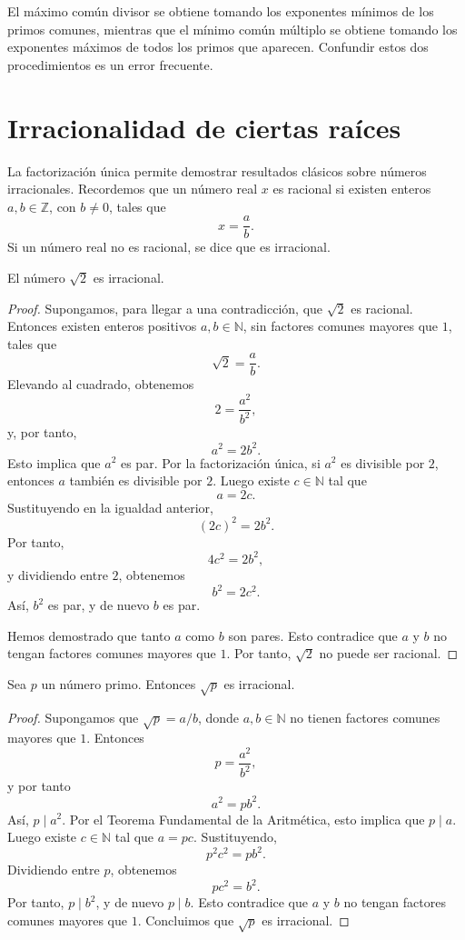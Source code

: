\begin{advertencia}
El máximo común divisor se obtiene tomando los exponentes mínimos de los primos comunes, mientras que el mínimo común múltiplo se obtiene tomando los exponentes máximos de todos los primos que aparecen. Confundir estos dos procedimientos es un error frecuente.
\end{advertencia}

\section{Irracionalidad de ciertas raíces}

La factorización única permite demostrar resultados clásicos sobre números irracionales. Recordemos que un número real \(x\) es racional si existen enteros \(a,b\in\mathbb{Z}\), con \(b\neq 0\), tales que
\[
  x=\frac{a}{b}.
\]
Si un número real no es racional, se dice que es irracional.

\begin{teorema}
El número \(\sqrt{2}\) es irracional.
\end{teorema}

\begin{proof}
Supongamos, para llegar a una contradicción, que \(\sqrt{2}\) es racional. Entonces existen enteros positivos \(a,b\in\mathbb{N}\), sin factores comunes mayores que \(1\), tales que
\[
  \sqrt{2}=\frac{a}{b}.
\]
Elevando al cuadrado, obtenemos
\[
  2=\frac{a^2}{b^2},
\]
y, por tanto,
\[
  a^2=2b^2.
\]
Esto implica que \(a^2\) es par. Por la factorización única, si \(a^2\) es divisible por \(2\), entonces \(a\) también es divisible por \(2\). Luego existe \(c\in\mathbb{N}\) tal que
\[
  a=2c.
\]
Sustituyendo en la igualdad anterior,
\[
  (2c)^2=2b^2.
\]
Por tanto,
\[
  4c^2=2b^2,
\]
y dividiendo entre \(2\), obtenemos
\[
  b^2=2c^2.
\]
Así, \(b^2\) es par, y de nuevo \(b\) es par.

Hemos demostrado que tanto \(a\) como \(b\) son pares. Esto contradice que \(a\) y \(b\) no tengan factores comunes mayores que \(1\). Por tanto, \(\sqrt{2}\) no puede ser racional.
\end{proof}

\begin{proposicion}
Sea \(p\) un número primo. Entonces \(\sqrt{p}\) es irracional.
\end{proposicion}

\begin{proof}
Supongamos que \(\sqrt{p}=a/b\), donde \(a,b\in\mathbb{N}\) no tienen factores comunes mayores que \(1\). Entonces
\[
  p=\frac{a^2}{b^2},
\]
y por tanto
\[
  a^2=pb^2.
\]
Así, \(p\mid a^2\). Por el Teorema Fundamental de la Aritmética, esto implica que \(p\mid a\). Luego existe \(c\in\mathbb{N}\) tal que \(a=pc\). Sustituyendo,
\[
  p^2c^2=pb^2.
\]
Dividiendo entre \(p\), obtenemos
\[
  pc^2=b^2.
\]
Por tanto, \(p\mid b^2\), y de nuevo \(p\mid b\). Esto contradice que \(a\) y \(b\) no tengan factores comunes mayores que \(1\). Concluimos que \(\sqrt{p}\) es irracional.
\end{proof}

